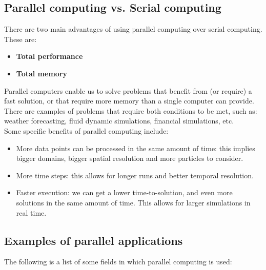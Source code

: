 \subsection{Parallel computing vs. Serial computing}

There are two main advantages of using parallel computing over serial computing. These 
are:

\begin{itemize}
    \item \textbf{Total performance}
    \item \textbf{Total memory}
\end{itemize}

Parallel computers enable us to solve problems that benefit from (or require) a fast solution,
or that require more memory than a single computer can provide. There are examples of problems
that require both conditions to be met, such as: weather forecasting, fluid dynamic
simulations, financial simulations, etc.\\

Some specific benefits of parallel computing include:

\begin{itemize}
    \item More data points can be processed in the same amount of time: this implies
    bigger domains, bigger spatial resolution and more particles to consider.

    \item More time steps: this allows for longer runs and better temporal resolution.
    
    \item Faster execution: we can get a lower time-to-solution, and even more solutions
    in the same amount of time. This allows for larger simulations in real time.
\end{itemize}

\subsection{Examples of parallel applications}

The following is a list of some fields in which parallel computing is used:

